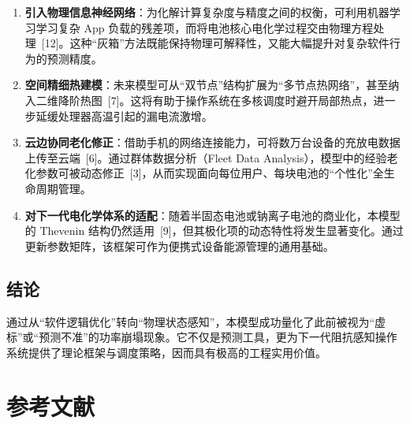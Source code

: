 \documentclass[11pt,a4paper]{ctexart}
\begin{document}
\begin{enumerate}
\item \textbf{引入物理信息神经网络}：为化解计算复杂度与精度之间的权衡，可利用机器学习学习复杂 App 负载的残差项，而将电池核心电化学过程交由物理方程处理~[12]。这种“灰箱”方法既能保持物理可解释性，又能大幅提升对复杂软件行为的预测精度。
\item \textbf{空间精细热建模}：未来模型可从“双节点”结构扩展为“多节点热网络”，甚至纳入二维降阶热图~[7]。这将有助于操作系统在多核调度时避开局部热点，进一步延缓处理器高温引起的漏电流激增。
\item \textbf{云边协同老化修正}：借助手机的网络连接能力，可将数万台设备的充放电数据上传至云端~[6]。通过群体数据分析（Fleet Data Analysis），模型中的经验老化参数可被动态修正~[3]，从而实现面向每位用户、每块电池的“个性化”全生命周期管理。
\item \textbf{对下一代电化学体系的适配}：随着半固态电池或钠离子电池的商业化，本模型的 Thevenin 结构仍然适用~[9]，但其极化项的动态特性将发生显著变化。通过更新参数矩阵，该框架可作为便携式设备能源管理的通用基础。
\end{enumerate}

\subsection{结论}

通过从“软件逻辑优化”转向“物理状态感知”，本模型成功量化了此前被视为“虚标”或“预测不准”的功率崩塌现象。它不仅是预测工具，更为下一代阻抗感知操作系统提供了理论框架与调度策略，因而具有极高的工程实用价值。

\newpage

\section*{参考文献}
\end{document}
